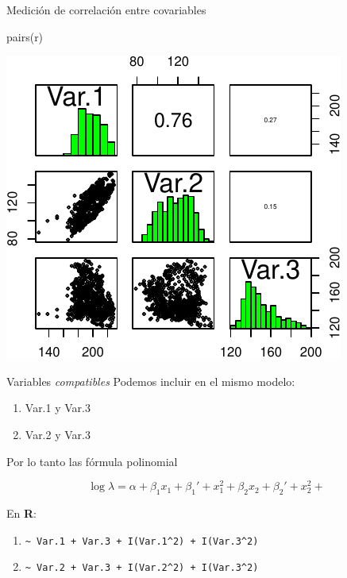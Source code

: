 \documentclass[
  11pt,
  ignorenonframetext,
]{beamer}
\newenvironment{Shaded}{}{}
\newcommand{\FunctionTok}[1]{\textcolor[rgb]{0.02,0.16,0.49}{#1}}
\newcommand{\NormalTok}[1]{#1}
\providecommand{\tightlist}{%
  \setlength{\itemsep}{0pt}\setlength{\parskip}{0pt}}
\begin{document}
\begin{frame}[fragile]{Medición de correlación entre covariables}
\protect\hypertarget{mediciuxf3n-de-correlaciuxf3n-entre-covariables}{}
\begin{Shaded}
\begin{Highlighting}[]
\FunctionTok{pairs}\NormalTok{(r)}
\end{Highlighting}
\end{Shaded}

\begin{center}\includegraphics{Tutorial-spatstat-2_files/figure-beamer/unnamed-chunk-13-1} \end{center}
\end{frame}

\begin{frame}[fragile]{Variables \emph{compatibles}}
\protect\hypertarget{variables-compatibles}{}
Podemos incluir en el mismo modelo:

\begin{enumerate}
\tightlist
\item
  Var.1 y Var.3
\item
  Var.2 y Var.3
\end{enumerate}

Por lo tanto las fórmula polinomial

\[\log \lambda = \alpha  + \beta_1 x_1 + \beta_1' + x_1^2 + \beta_2 x_2 + \beta_2' + x_2^2 +\]

En \textbf{R}:

\begin{enumerate}
\tightlist
\item
  \texttt{\textasciitilde{}\ Var.1\ +\ Var.3\ +\ I(Var.1\^{}2)\ +\ I(Var.3\^{}2)}
\item
  \texttt{\textasciitilde{}\ Var.2\ +\ Var.3\ +\ I(Var.2\^{}2)\ +\ I(Var.3\^{}2)}
\end{enumerate}
\end{frame}
\end{document}
